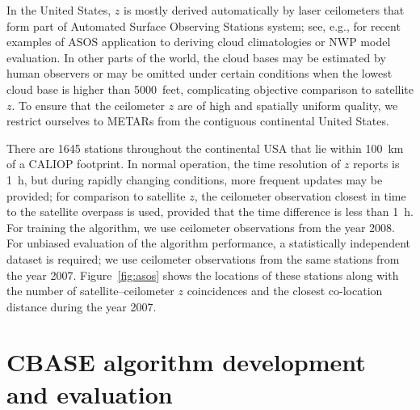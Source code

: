 \documentclass[essd,manuscript]{copernicus}\usepackage[]{graphicx}\usepackage[]{color}
\newcommand\CBH{\ensuremath{z}}
\begin{document}
In the United States, \CBH{} is mostly derived automatically by laser ceilometers
that form part of Automated Surface Observing Stations \citep[ASOS,][]{asos}
system; see, e.g., \cite{An2017,Ikeda2017} for recent examples of ASOS
application to deriving cloud climatologies or NWP model evaluation.  In other
parts of the world, the cloud bases may be estimated by human observers or may
be omitted under certain conditions when the lowest cloud base is higher than
5000~\unit{feet}, complicating objective comparison to satellite \CBH{}.  To ensure that
the ceilometer \CBH{} are of high and spatially uniform quality, we restrict
ourselves to METARs from the contiguous continental United States.

There are 1645 %
stations throughout the continental USA that lie within 100~km of a CALIOP
footprint.  In normal operation, the time resolution of \CBH{} reports is 1~h, but
during rapidly changing conditions, more frequent updates may be provided; for
comparison to satellite \CBH{}, the ceilometer observation closest in time to the
satellite overpass is used, provided that the time difference is less than 1~h.
For training the algorithm, we use ceilometer observations from the year 2008.
For unbiased evaluation of the algorithm performance, a statistically
independent dataset is required; we use ceilometer observations from the same
stations from the year 2007.  Figure~\ref{fig:asos} shows the locations of these
stations along with the number of satellite--ceilometer \CBH{} coincidences and the
closest co-location distance during the year 2007.

\section{CBASE algorithm development and evaluation}
\label{sec:algorithm}
\end{document}
